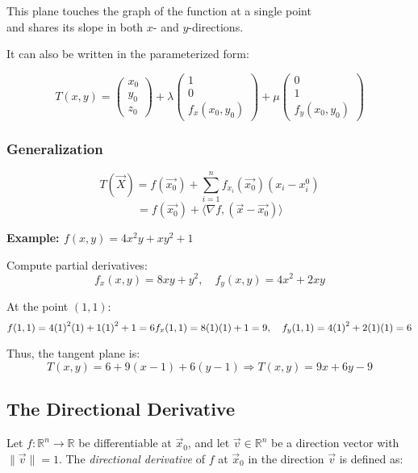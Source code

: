 This plane touches the graph of the function at a single point\\
and shares its slope in both \( x \)- and \( y \)-directions.

It can also be written in the parameterized form:

\[
T(x,y) = \begin{pmatrix} x_0\\ y_0\\ z_0\end{pmatrix} + \lambda 
\begin{pmatrix} 1\\ 0 \\ f_x(x_0,y_0)\end{pmatrix} + \mu \begin{pmatrix}
0 \\ 1 \\ f_y(x_0, y_0)
\end{pmatrix}
\]

\subsubsection{Generalization}
\[
T(\vec{X}) = f(\vec{x_0}) + \sum_{i = 1}^{n} f_{x_i}(\vec{x_0})(x_i - x_{i}^0)
\]
\[
 = f(\vec{x_0}) + \langle \nabla f, (\vec{x} - \vec{x_0})\rangle
\]

\textbf{Example: \( f(x, y) = 4x^2y + xy^2 + 1 \)}
\vspace{\baselineskip}

Compute partial derivatives:
\[
f_x(x, y) = 8xy + y^2, \quad f_y(x, y) = 4x^2 + 2xy
\]

At the point \( (1, 1) \):
\[
f(1, 1) = 4{(1)}^2(1) + 1{(1)}^2 + 1 = 6 \\
f_x(1, 1) = 8(1)(1) + 1 = 9, \quad f_y(1, 1) = 4{(1)}^2 + 2(1)(1) = 6
\]

Thus, the tangent plane is:
\[
T(x, y) = 6 + 9(x - 1) + 6(y - 1)
\Rightarrow T(x, y) = 9x + 6y - 9
\]

\subsection{The Directional Derivative}

Let \( f : \mathbb{R}^n \to \mathbb{R} \) be differentiable at \( \vec{x}_0 \), 
and let \( \vec{v} \in \mathbb{R}^n \) be a direction vector with \( \|\vec{v}\| = 1 \). The 
\emph{directional derivative} of \( f \) at \( \vec{x}_0 \) in the direction \( \vec{v} \) is defined as:


